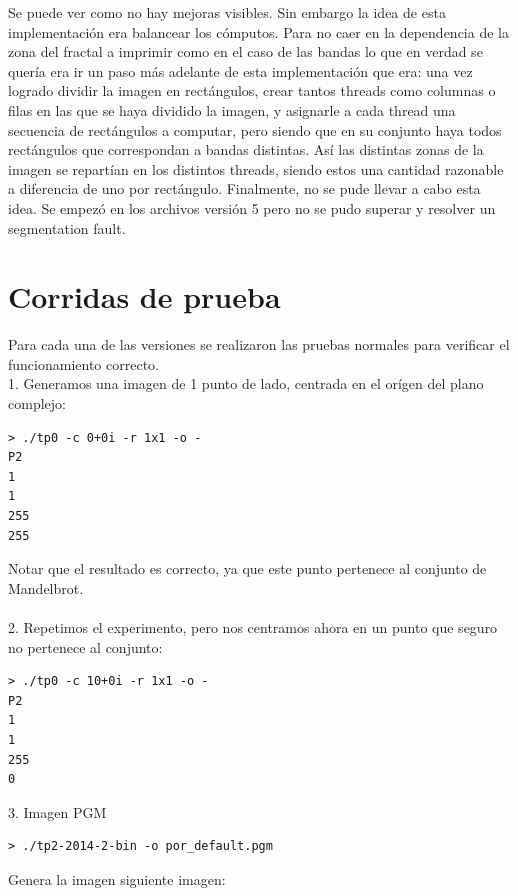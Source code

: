 \documentclass[a4paper,10pt]{article}
\begin{document}
Se puede ver como no hay mejoras visibles. Sin embargo la idea de esta implementación era balancear los cómputos.
Para no caer en la dependencia de la zona del fractal a imprimir como en el caso de las bandas lo que en verdad se quería
era ir un paso más adelante de esta implementación que era: una vez logrado dividir la imagen en rectángulos, crear tantos
threads como columnas o filas en las que se haya dividido la imagen, y asignarle a cada thread una secuencia de rectángulos
a computar, pero siendo que en su conjunto haya todos rectángulos que correspondan a bandas distintas. Así las distintas
zonas de la imagen se repartían en los distintos threads, siendo estos una cantidad razonable a diferencia de uno por
rectángulo. Finalmente, no se pude llevar a cabo esta idea. Se empezó en los archivos versión 5 pero no se pudo superar 
y resolver un segmentation fault.



\section{Corridas de prueba}

Para cada una de las versiones se realizaron las pruebas normales para verificar el funcionamiento correcto.\\

1. Generamos una imagen de 1 punto de lado, centrada en el or\'igen del plano complejo:
\begin{verbatim}
> ./tp0 -c 0+0i -r 1x1 -o -
P2
1
1
255
255
\end{verbatim}

Notar que el resultado es correcto, ya que este punto pertenece al conjunto de Mandelbrot.\\
\\
2. Repetimos el experimento, pero nos centramos ahora en un punto que seguro no pertenece
al conjunto:
\begin{verbatim}
> ./tp0 -c 10+0i -r 1x1 -o -
P2
1
1
255
0
\end{verbatim}

3. Imagen PGM
\begin{verbatim}
> ./tp2-2014-2-bin -o por_default.pgm
\end{verbatim}
Genera la imagen siguiente imagen:
\end{document}
